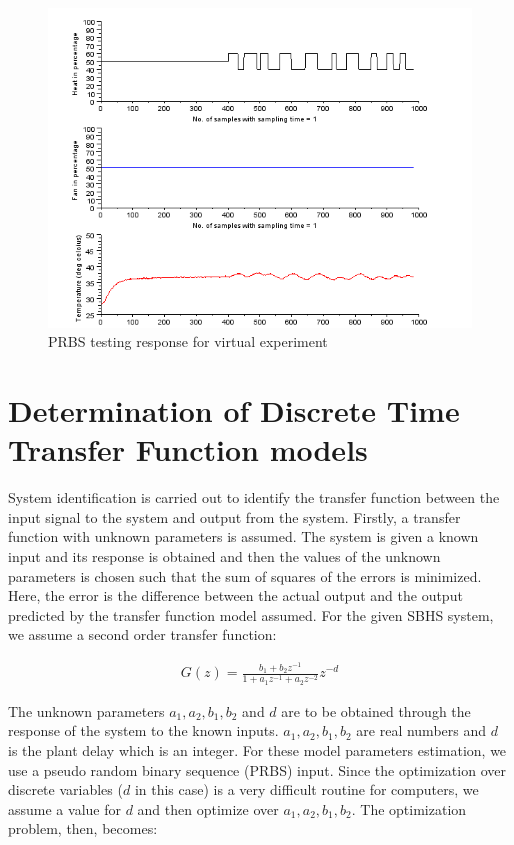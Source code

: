 \begin{figure}
\centering
\includegraphics[width=0.7\linewidth]{prbs/prbs-virtual.png}
\caption{PRBS testing response for virtual experiment}
\label{prbs-res}
\end{figure}


\section{Determination of Discrete Time Transfer Function models}\label{prbs-model}

System identification is carried out to identify the transfer function between the input signal to the system and output 
from the system. Firstly, a transfer function with unknown parameters is assumed. The system is given a known input and its
response is obtained and then the values of the unknown parameters is chosen such that the sum of squares of the errors is 
minimized. Here, the error is the difference between the actual output and the output predicted by the transfer function model
assumed.
For the given SBHS system, we assume a second order transfer function:

\begin{align}\label{DTF}
G(z)=\frac{b_{1}+b_{2}z^{-1}}{1+a_{1}z^{-1}+a_{2}z^{-2}}z^{-d}
\end{align}


The unknown parameters $a_1, a_2, b_1, b_2$ and $d$ are to be obtained through the response of the system to the known inputs.
$a_1, a_2, b_1, b_2$ are real numbers and $d$ is the plant delay which is an integer.  For these model parameters estimation, we
use a pseudo random binary sequence (PRBS) input. Since the optimization over discrete variables ($d$ in this case) is a very 
difficult routine for computers, we assume a value for $d$ and then optimize over  $a_1, a_2, b_1, b_2$. The optimization 
problem, then, becomes:



